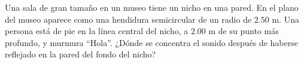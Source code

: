 \item Una sala de gran tamaño en un museo tiene un nicho en una pared. En el plano del museo aparece como una hendidura semicircular de un radio de $2.50\text{ m}$. Una persona está de pie en la línea central del nicho, a $2.00\text{ m}$ de su punto más profundo, y murmura ``Hola''. ¿Dónde se concentra el sonido después de haberse reflejado en la pared del fondo del nicho?